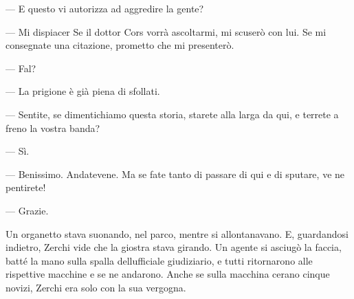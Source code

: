 --- E questo vi autorizza ad aggredire la gente?

--- Mi dispiacer Se il dottor Cors vorrà ascoltarmi, mi scuserò con lui.
Se mi consegnate una citazione, prometto che mi presenterò.

--- Fal?

--- La prigione è già piena di sfollati.

--- Sentite, se dimentichiamo questa storia, starete alla larga da qui,
e terrete a freno la vostra banda?

--- Sì.

--- Benissimo. Andatevene. Ma se fate tanto di passare di qui e di
sputare, ve ne pentirete!

--- Grazie.

Un organetto stava suonando, nel parco, mentre si allontanavano. E,
guardandosi indietro, Zerchi vide che la giostra stava girando. Un
agente si asciugò la faccia, batté la mano sulla spalla
dell\textquotesingle ufficiale giudiziario, e tutti ritornarono alle
rispettive macchine e se ne andarono. Anche se sulla macchina
c\textquotesingle erano cinque novizi, Zerchi era solo con la sua
vergogna.
